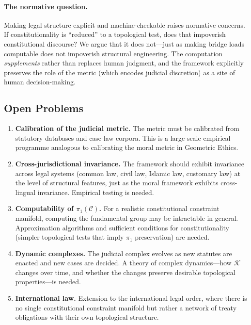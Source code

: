 \documentclass[12pt]{article}
\theoremstyle{definition}
\theoremstyle{remark}
\newcommand{\C}{\mathcal{C}}               %
\begin{document}
\paragraph{The normative question.}
Making legal structure explicit and machine-checkable raises normative concerns.  If constitutionality is ``reduced'' to a topological test, does that impoverish constitutional discourse?  We argue that it does not---just as making bridge loads computable does not impoverish structural engineering.  The computation \emph{supplements} rather than replaces human judgment, and the framework explicitly preserves the role of the metric (which encodes judicial discretion) as a site of human decision-making.

\subsection{Open Problems}

\begin{enumerate}
    \item \textbf{Calibration of the judicial metric.}  The metric must be calibrated from statutory databases and case-law corpora.  This is a large-scale empirical programme analogous to calibrating the moral metric in Geometric Ethics.

    \item \textbf{Cross-jurisdictional invariance.}  The framework should exhibit invariance across legal systems (common law, civil law, Islamic law, customary law) at the level of structural features, just as the moral framework exhibits cross-lingual invariance.  Empirical testing is needed.

    \item \textbf{Computability of $\pi_1(\C)$.}  For a realistic constitutional constraint manifold, computing the fundamental group may be intractable in general.  Approximation algorithms and sufficient conditions for constitutionality (simpler topological tests that imply $\pi_1$ preservation) are needed.

    \item \textbf{Dynamic complexes.}  The judicial complex evolves as new statutes are enacted and new cases are decided.  A theory of complex dynamics---how $\mathcal{K}$ changes over time, and whether the changes preserve desirable topological properties---is needed.

    \item \textbf{International law.}  Extension to the international legal order, where there is no single constitutional constraint manifold but rather a network of treaty obligations with their own topological structure.
\end{enumerate}
\end{document}
